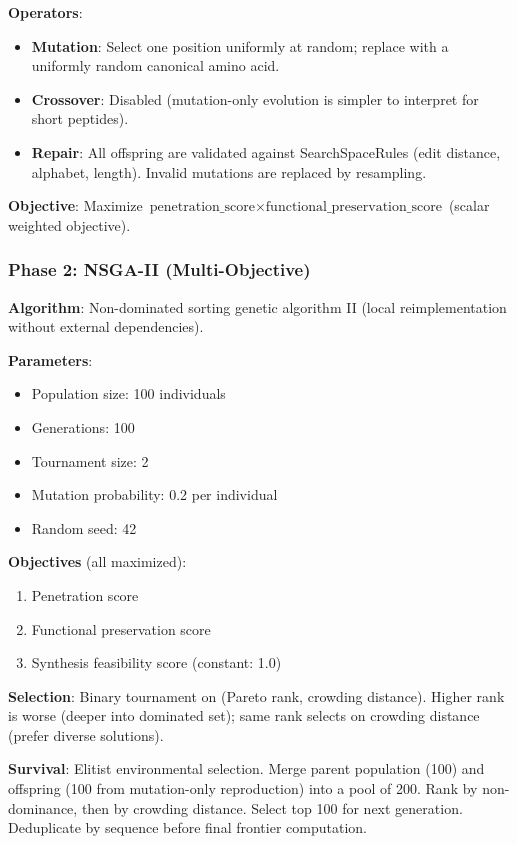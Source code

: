 \documentclass[11pt,letterpaper]{article}
\begin{document}
\textbf{Operators}:
\begin{itemize}
  \item \textbf{Mutation}: Select one position uniformly at random; replace with a uniformly random canonical amino acid.
  \item \textbf{Crossover}: Disabled (mutation-only evolution is simpler to interpret for short peptides).
  \item \textbf{Repair}: All offspring are validated against SearchSpaceRules (edit distance, alphabet, length). Invalid mutations are replaced by resampling.
\end{itemize}

\textbf{Objective}: Maximize $\text{penetration\_score} \times \text{functional\_preservation\_score}$ (scalar weighted objective).

\subsubsection{Phase 2: NSGA-II (Multi-Objective)}

\textbf{Algorithm}: Non-dominated sorting genetic algorithm II (local reimplementation without external dependencies).

\textbf{Parameters}:
\begin{itemize}
  \item Population size: 100 individuals
  \item Generations: 100
  \item Tournament size: 2
  \item Mutation probability: 0.2 per individual
  \item Random seed: 42
\end{itemize}

\textbf{Objectives} (all maximized):
\begin{enumerate}
  \item Penetration score
  \item Functional preservation score
  \item Synthesis feasibility score (constant: 1.0)
\end{enumerate}

\textbf{Selection}: Binary tournament on (Pareto rank, crowding distance). Higher rank is worse (deeper into dominated set); same rank selects on crowding distance (prefer diverse solutions).

\textbf{Survival}: Elitist environmental selection. Merge parent population (100) and offspring (100 from mutation-only reproduction) into a pool of 200. Rank by non-dominance, then by crowding distance. Select top 100 for next generation. Deduplicate by sequence before final frontier computation.
\end{document}
